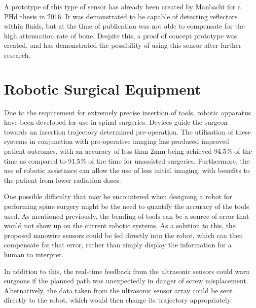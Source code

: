 \documentclass[conference, a4paper]{IEEEtran}
\begin{document}
A prototype of this type of sensor has already been created by Manbachi for 
a PHd thesis in 2016. It was demonstrated to be capable of detecting reflectors
within fluids, but at the time of publication was not able to compensate for
the high attenuation rate of bone. Despite this, a proof of concept prototype
was created, and has demonstrated the possibility of using this sensor after
further research\cite{Manbachi2016}.

\section{Robotic Surgical Equipment}
Due to the requirement for extremely precise insertion of tools, robotic apparatus have been
developed for use in spinal surgeries. Devices guide the surgeon towards an insertion trajectory
determined pre-operation\cite{Hu2012}. The utilisation of these systems in conjunction with pre-operative
imaging has produced improved patient outcomes, with an accuracy of less than 2mm being
achieved 94.5$\%$ of the time as compared to 91.5$\%$ of the time for unassisted surgeries\cite{Kantelhardt2011}.
Furthermore, the use of robotic assistance can allow the use of less initial imaging, with benefits
to the patient from lower radiation doses.

One possible difficulty that may be encountered when designing a robot for performing
spine surgery might be the need to quantify the accuracy of the tools used. As mentioned
previously, the bending of tools can be a source of error that would not show up on the
current robotic systems. As a solution to this, the proposed nanowire sensors could
be fed directly into the robot, which can then compensate for that error, rather than 
simply display the information for a human to interpret.

In addition to this, the real-time feedback from the ultrasonic sensors could warn surgeons
if the planned path was unexpectedly in danger of screw misplacement. Alternatively, the 
data taken from the ultrasonic sensor array could be sent directly to the robot, which
would then change its trajectory appropriately.
\end{document}
